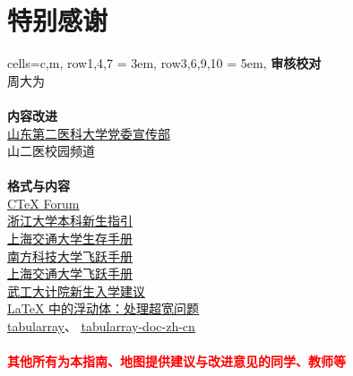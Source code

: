 \chapter*{特别感谢}
\begin{tblr}[
    long,
    theme=no-caption
    ]{
    cells={c,m},
    row{1,4,7} = {3em},
    row{3,6,9,10} = {5em},}
    {\large\textbf{审核校对}}                                                             \\
    {周大为}                                                                              \\
    \\
    {\large\textbf{内容改进}}                                                             \\
    {
    \uline{\href{https://xchb.sdsmu.edu.cn/}{山东第二医科大学党委宣传部}}                 \\
    山二医校园频道
    }                                                                                     \\
    \\
    {\large\textbf{格式与内容}}                                                           \\
    {
    \uline{\href{https://github.com/CTeX-org/forum/issues}{CTeX Forum}}                   \\
    \uline{\href{https://zjuers.com/welcome/}{浙江大学本科新生指引}}                      \\
    \uline{\href{https://survivesjtu.gitbook.io/survivesjtumanual}{上海交通大学生存手册}} \\
    \uline{\href{https://sustech-application.com/}{南方科技大学飞跃手册}}                 \\
    \uline{\href{https://survivesjtu.github.io/SJTU-Application/}{上海交通大学飞跃手册}}  \\
    \uline{\href{https://gitee.com/hanyaner/witjij}{武工大计院新生入学建议}}              \\
    \uline{\href{https://liam.page/2017/03/22/floats-in-LaTeX-handle-overfull-floats/}{%
    LaTeX 中的浮动体：处理超宽问题}}                                                      \\
    \uline{\href{https://github.com/lvjr/tabularray}{tabularray}}、%
    \uline{\href{https://gitee.com/nwafu_nan/tabularray-doc-zh-cn}{tabularray-doc-zh-cn}}
    }                                                                                     \\
    \\
    {\large\textbf{\textcolor{red}{其他所有为本指南、地图提供建议与改进意见的同学、教师等}}}
\end{tblr}
